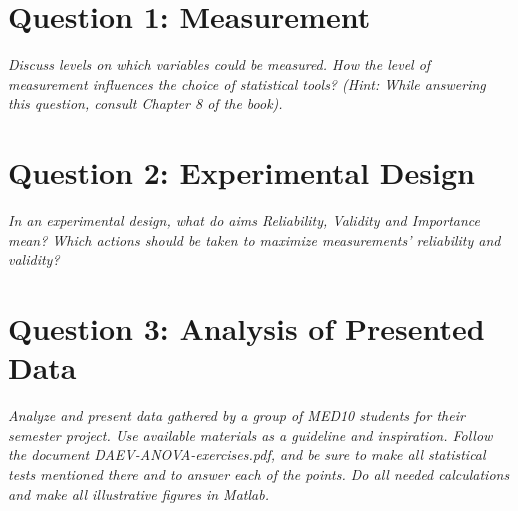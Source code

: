 \section{Question 1: Measurement}
\textit{Discuss levels on which variables could be measured. How the level of measurement influences the choice of statistical tools? (Hint: While answering this question, consult Chapter 8 of the book).}

\section{Question 2: Experimental Design}
\textit{In an experimental design, what do aims Reliability, Validity and Importance mean? Which actions should be taken to maximize measurements' reliability and validity?}


\section{Question 3: Analysis of Presented Data}
\textit{Analyze and present data gathered by a group of MED10 students for their semester project. Use available materials as a guideline and inspiration. Follow the document DAEV-ANOVA-exercises.pdf, and be sure to make all statistical tests mentioned there and to answer each of the points. Do all needed calculations and make all illustrative figures in Matlab.}


